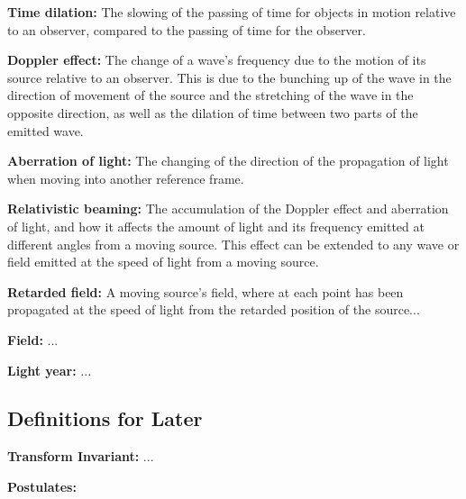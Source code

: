 \noindent \hypertarget{def-time-dilation}{\textbf{Time dilation:}}
The slowing of the passing of time for objects in motion relative to an observer, compared to the passing of time for the observer.

\noindent \hypertarget{def-doppler-effect}{\textbf{Doppler effect:}}
The change of a wave's frequency due to the motion of its source relative to an observer. This is due to the bunching up of the wave in the direction of movement of the source and the stretching of the wave in the opposite direction, as well as the dilation of time between two parts of the emitted wave.

\noindent \hypertarget{def-aberration}{\textbf{Aberration of light:}}
The changing of the direction of the propagation of light when moving into another reference frame.

\noindent \hypertarget{def-relativistic-beaming}{\textbf{Relativistic beaming:}}
The accumulation of the Doppler effect and aberration of light, and how it affects the amount of light and its frequency emitted at different angles from a moving source. This effect can be extended to any wave or field emitted at the speed of light from a moving source.

\noindent \hypertarget{def-retarded-field}{\textbf{Retarded field:}}
A moving source's field, where at each point has been propagated at the speed of light from the retarded position of the source...

\noindent \hypertarget{def-field}{\textbf{Field:}}
...

\noindent \hypertarget{def-light-year}{\textbf{Light year:}}
...

\subsection{Definitions for Later}%

\noindent \hypertarget{def-lorentz-invariant}{\textbf{Transform Invariant:}}
...

\noindent \hypertarget{def-postulates}{\textbf{Postulates:}}